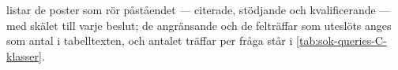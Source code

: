  listar de poster som rör påståendet ---
citerade, stödjande och kvalificerande --- med skälet till varje beslut;
de angränsande och de felträffar som uteslöts anges som antal i
tabelltexten, och antalet träffar per fråga står i
\cref{tab:sok-queries-C-klasser}.
